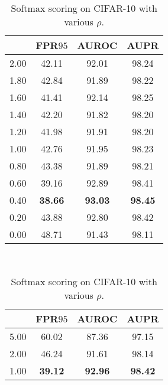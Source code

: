 \documentclass{article}
\begin{document}
\begin{table}[t]
\centering
\parbox{.30\linewidth}{
\centering
\scriptsize
\caption{Softmax scoring on CIFAR-$10$ with various $\sigma_1$.} \label{tab: 18}
\vspace{5pt}
{
\begin{tabular}{c|ccc}
\toprule[1.5pt]
             & FPR$95$     & AUROC       & AUPR      \\
\midrule[0.6pt]
2.00               & 42.11                  & 92.01                  & 98.24      \\
1.80               & 42.84                  & 91.89                  & 98.22      \\
1.60               & 41.41                  & 92.14                  & 98.25       \\
1.40               & 42.20                  & 91.82                  & 98.20      \\
1.20               & 41.98                  & 91.91                  & 98.20      \\
1.00               & 42.76                  & 91.95                  & 98.23 \\ 
0.80               & 43.38                  & 91.89                  & 98.21 \\
0.60               & 39.16                  & 92.89                  & 98.41 \\ 
\cellcolor{greyC}0.40               & \cellcolor{greyC}\textbf{38.66}                  & \cellcolor{greyC}\textbf{93.03}                  & \cellcolor{greyC}\textbf{98.45} \\
0.20               & 43.88         & 92.80         & 98.42 \\
0.00               & 48.71                  & 91.43                  & 98.11 \\ 
\bottomrule[1.5pt]      
\end{tabular}
}}~~
\parbox{.30\linewidth}{
\centering
\caption{Softmax scoring on CIFAR-10 with various $\rho$.} 
\scriptsize
\vspace{5pt}
{
\begin{tabular}{c|ccc}
\toprule[1.5pt]
            & FPR$95$     & AUROC      & AUPR      \\
\midrule[0.6pt]
5.00               & 60.02                  & 87.36                  & 97.15       \\
2.00               & 46.24                  & 91.61                  & 98.14       \\
\cellcolor{greyC}1.00               & \cellcolor{greyC}\textbf{39.12}                  & \cellcolor{greyC}\textbf{92.96}                  & \cellcolor{greyC}\textbf{98.42}       \\

\end{tabular}}}
\end{table}
\end{document}
